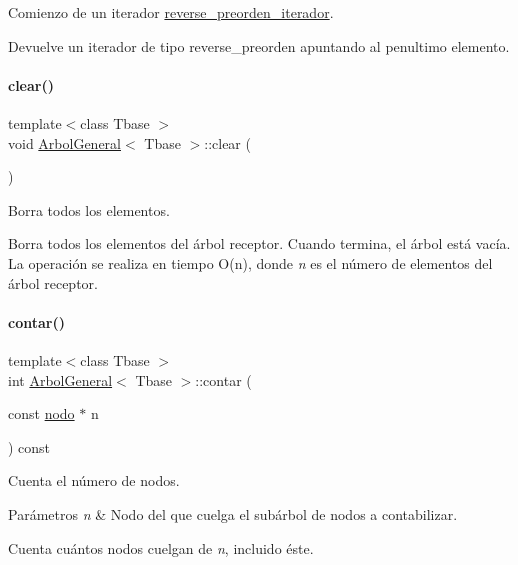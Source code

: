 Comienzo de un iterador \hyperlink{classArbolGeneral_1_1reverse__preorden__iterador}{reverse\+\_\+preorden\+\_\+iterador}. 

\begin{DoxyReturn}{Devuelve}
un iterador de tipo reverse\+\_\+preorden apuntando al penultimo elemento. 
\end{DoxyReturn}
\hypertarget{classArbolGeneral_a3ae21db42586b23ccc082aeb321db56f}{}\label{classArbolGeneral_a3ae21db42586b23ccc082aeb321db56f} 
\paragraph{\texorpdfstring{clear()}{clear()}}
{\footnotesize\ttfamily template$<$class Tbase $>$ \\
void \hyperlink{classArbolGeneral}{Arbol\+General}$<$ Tbase $>$\+::clear (\begin{DoxyParamCaption}{ }\end{DoxyParamCaption})}



Borra todos los elementos. 

Borra todos los elementos del árbol receptor. Cuando termina, el árbol está vacía. La operación se realiza en tiempo O(n), donde {\itshape n} es el número de elementos del árbol receptor. \hypertarget{classArbolGeneral_a9f8c2adf966a9fe3155921bb849d3999}{}\label{classArbolGeneral_a9f8c2adf966a9fe3155921bb849d3999} 
\paragraph{\texorpdfstring{contar()}{contar()}}
{\footnotesize\ttfamily template$<$class Tbase $>$ \\
int \hyperlink{classArbolGeneral}{Arbol\+General}$<$ Tbase $>$\+::contar (\begin{DoxyParamCaption}\item[{const \hyperlink{structArbolGeneral_1_1nodo}{nodo} $\ast$}]{n }\end{DoxyParamCaption}) const\hspace{0.3cm}{\ttfamily [private]}}



Cuenta el número de nodos. 


\begin{DoxyParams}{Parámetros}
{\em n} & Nodo del que cuelga el subárbol de nodos a contabilizar.\\
\hline
\end{DoxyParams}
Cuenta cuántos nodos cuelgan de {\itshape n}, incluido éste. \hypertarget{classArbolGeneral_a4842a2c8abe5979ef0a32fda99ea493d}{}\label{classArbolGeneral_a4842a2c8abe5979ef0a32fda99ea493d} 

